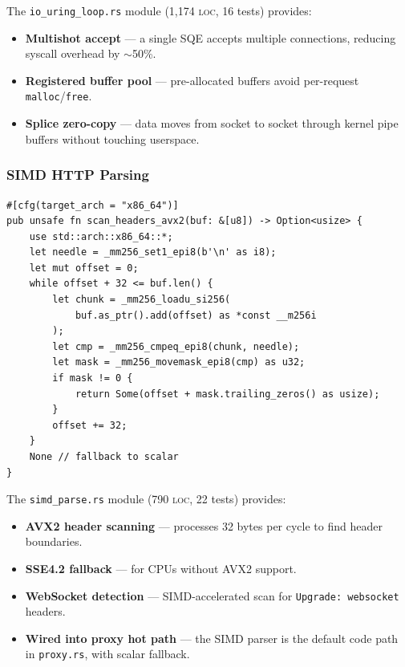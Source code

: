 \documentclass[a4paper, 11pt]{article}
\newcommand{\loc}{\textsc{loc}}
\begin{document}
The \texttt{io\_uring\_loop.rs} module (1,174 \loc{}, 16 tests) provides:

\begin{itemize}[nosep]
  \item \textbf{Multishot accept} --- a single SQE accepts multiple
        connections, reducing syscall overhead by $\sim$50\%.
  \item \textbf{Registered buffer pool} --- pre-allocated buffers avoid
        per-request \texttt{malloc}/\texttt{free}.
  \item \textbf{Splice zero-copy} --- data moves from socket to socket
        through kernel pipe buffers without touching userspace.
\end{itemize}

\subsubsection{SIMD HTTP Parsing}

\begin{lstlisting}[caption={AVX2 header scanning},
  label=lst:simd]
#[cfg(target_arch = "x86_64")]
pub unsafe fn scan_headers_avx2(buf: &[u8]) -> Option<usize> {
    use std::arch::x86_64::*;
    let needle = _mm256_set1_epi8(b'\n' as i8);
    let mut offset = 0;
    while offset + 32 <= buf.len() {
        let chunk = _mm256_loadu_si256(
            buf.as_ptr().add(offset) as *const __m256i
        );
        let cmp = _mm256_cmpeq_epi8(chunk, needle);
        let mask = _mm256_movemask_epi8(cmp) as u32;
        if mask != 0 {
            return Some(offset + mask.trailing_zeros() as usize);
        }
        offset += 32;
    }
    None // fallback to scalar
}
\end{lstlisting}

The \texttt{simd\_parse.rs} module (790 \loc{}, 22 tests) provides:

\begin{itemize}[nosep]
  \item \textbf{AVX2 header scanning} --- processes 32 bytes per cycle
        to find header boundaries.
  \item \textbf{SSE4.2 fallback} --- for CPUs without AVX2 support.
  \item \textbf{WebSocket detection} --- SIMD-accelerated scan for
        \texttt{Upgrade: websocket} headers.
  \item \textbf{Wired into proxy hot path} --- the SIMD parser is the
        default code path in \texttt{proxy.rs}, with scalar fallback.
\end{itemize}
\end{document}
